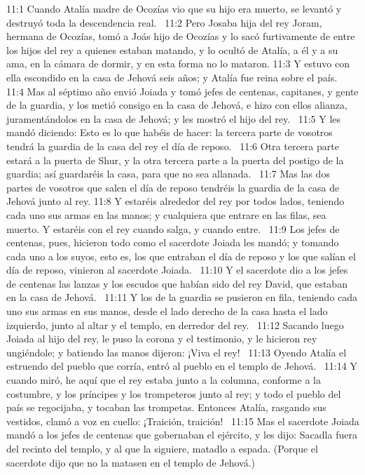 11:1 Cuando Atalía madre de Ocozías vio que su hijo era muerto, se levantó y destruyó toda la descendencia real.  
11:2 Pero Josaba hija del rey Joram, hermana de Ocozías, tomó a Joás hijo de Ocozías y lo sacó furtivamente de entre los hijos del rey a quienes estaban matando, y lo ocultó de Atalía, a él y a su ama, en la cámara de dormir, y en esta forma no lo mataron. 
11:3 Y estuvo con ella escondido en la casa de Jehová seis años; y Atalía fue reina sobre el país.  
11:4 Mas al séptimo año envió Joiada y tomó jefes de centenas, capitanes, y gente de la guardia, y los metió consigo en la casa de Jehová, e hizo con ellos alianza, juramentándolos en la casa de Jehová; y les mostró el hijo del rey.  
11:5 Y les mandó diciendo: Esto es lo que habéis de hacer: la tercera parte de vosotros tendrá la guardia de la casa del rey el día de reposo.  
11:6 Otra tercera parte estará a la puerta de Shur, y la otra tercera parte a la puerta del postigo de la guardia; así guardaréis la casa, para que no sea allanada.  
11:7 Mas las dos partes de vosotros que salen el día de reposo tendréis la guardia de la casa de Jehová junto al rey. 
11:8 Y estaréis alrededor del rey por todos lados, teniendo cada uno sus armas en las manos; y cualquiera que entrare en las filas, sea muerto. Y estaréis con el rey cuando salga, y cuando entre.  
11:9 Los jefes de centenas, pues, hicieron todo como el sacerdote Joiada les mandó; y tomando cada uno a los suyos, esto es, los que entraban el día de reposo y los que salían el día de reposo, vinieron al sacerdote Joiada.  
11:10 Y el sacerdote dio a los jefes de centenas las lanzas y los escudos que habían sido del rey David, que estaban en la casa de Jehová.  
11:11 Y los de la guardia se pusieron en fila, teniendo cada uno sus armas en sus manos, desde el lado derecho de la casa hasta el lado izquierdo, junto al altar y el templo, en derredor del rey.  
11:12 Sacando luego Joiada al hijo del rey, le puso la corona y el testimonio, y le hicieron rey ungiéndole; y batiendo las manos dijeron: ¡Viva el rey!  
11:13 Oyendo Atalía el estruendo del pueblo que corría, entró al pueblo en el templo de Jehová.  
11:14 Y cuando miró, he aquí que el rey estaba junto a la columna, conforme a la costumbre, y los príncipes y los trompeteros junto al rey; y todo el pueblo del país se regocijaba, y tocaban las trompetas. Entonces Atalía, rasgando sus vestidos, clamó a voz en cuello: ¡Traición, traición!  
11:15 Mas el sacerdote Joiada mandó a los jefes de centenas que gobernaban el ejército, y les dijo: Sacadla fuera del recinto del templo, y al que la siguiere, matadlo a espada. (Porque el sacerdote dijo que no la matasen en el templo de Jehová.)  
